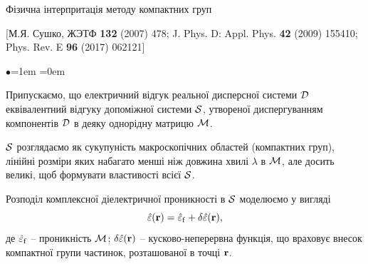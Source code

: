 \documentclass[10pt]{beamer}
\begin{document}
\begin{frame}{Фізична інтерпритація методу компактних груп}

\scriptsize{
[М.Я. Сушко, ЖЭТФ {\bf 132} (2007) 478; J. Phys. D: Appl. Phys. {\bf 42} (2009) 155410; Phys. Rev. E {\bf 96} (2017) 062121]
}


\begin{list}{$\bullet$}{\leftmargin=1em \itemindent=0em}\footnotesize

\item 
Припускаємо, що електричний відгук реальної дисперсної системи $\cal{D}$ еквівалентний відгуку допоміжної системи $\cal{S}$, утвореної диспергуванням компонентів $\cal{D}$ в деяку однорідну матрицю $\cal{M}$.

\item

$\cal{S}$ розглядаємо як сукупуність макроскопічних областей (компактних груп), лінійні розміри яких набагато менші ніж довжина хвилі $\lambda$ в $\cal{M}$, але досить великі, щоб формувати властивості всієї $\cal{S}$.

\item
Розподіл комплексної діелектричної проникності в $\cal{S}$ моделюємо у вигляді
$$
    \hat{\varepsilon} ({\bf r}) = \hat{\varepsilon}_{\rm f} + \delta\hat{\varepsilon} ({\bf r}),
$$
де $\hat{\varepsilon}_{\rm f}$ -- проникність $\cal{M}$; $\delta\hat{\varepsilon} ({\bf r})$ -- кусково-неперервна функція, що враховує внесок компактної групи частинок, розташованої в точці $\bf r$.

\end{list}

\end{frame}
\end{document}
